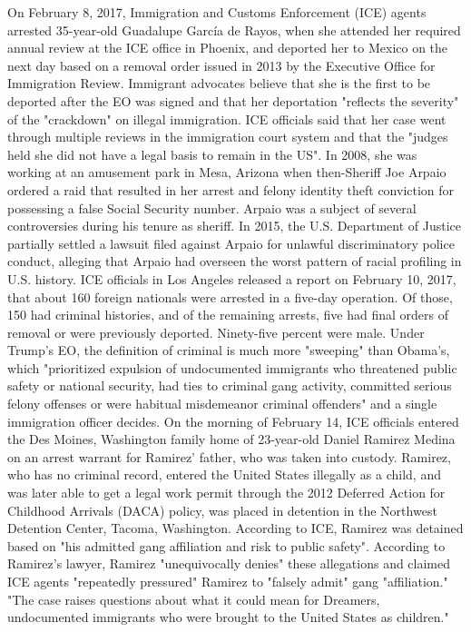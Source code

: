 On February 8, 2017, Immigration and Customs Enforcement (ICE) agents
arrested 35-year-old Guadalupe García de Rayos, when she attended her
required annual review at the ICE office in Phoenix, and deported her to
Mexico on the next day based on a removal order issued in 2013 by the
Executive Office for Immigration Review. Immigrant advocates believe
that she is the first to be deported after the EO was signed and that
her deportation "reflects the severity" of the "crackdown" on illegal
immigration. ICE officials said that her case went through multiple
reviews in the immigration court system and that the "judges held she
did not have a legal basis to remain in the US". In 2008, she was
working at an amusement park in Mesa, Arizona when then-Sheriff Joe
Arpaio ordered a raid that resulted in her arrest and felony identity
theft conviction for possessing a false Social Security number. Arpaio
was a subject of several controversies during his tenure as sheriff. In
2015, the U.S. Department of Justice partially settled a lawsuit filed
against Arpaio for unlawful discriminatory police conduct, alleging that
Arpaio had overseen the worst pattern of racial profiling in U.S.
history. ICE officials in Los Angeles released a report on February 10,
2017, that about 160 foreign nationals were arrested in a five-day
operation. Of those, 150 had criminal histories, and of the remaining
arrests, five had final orders of removal or were previously deported.
Ninety-five percent were male. Under Trump's EO, the definition of
criminal is much more "sweeping" than Obama's, which "prioritized
expulsion of undocumented immigrants who threatened public safety or
national security, had ties to criminal gang activity, committed serious
felony offenses or were habitual misdemeanor criminal offenders" and a
single immigration officer decides. On the morning of February 14, ICE
officials entered the Des Moines, Washington family home of 23-year-old
Daniel Ramirez Medina on an arrest warrant for Ramirez' father, who was
taken into custody. Ramirez, who has no criminal record, entered the
United States illegally as a child, and was later able to get a legal
work permit through the 2012 Deferred Action for Childhood Arrivals
(DACA) policy, was placed in detention in the Northwest Detention
Center, Tacoma, Washington. According to ICE, Ramirez was detained based
on "his admitted gang affiliation and risk to public safety". According
to Ramirez's lawyer, Ramirez "unequivocally denies" these allegations
and claimed ICE agents "repeatedly pressured" Ramirez to "falsely admit"
gang "affiliation." "The case raises questions about what it could mean
for Dreamers, undocumented immigrants who were brought to the United
States as children."

